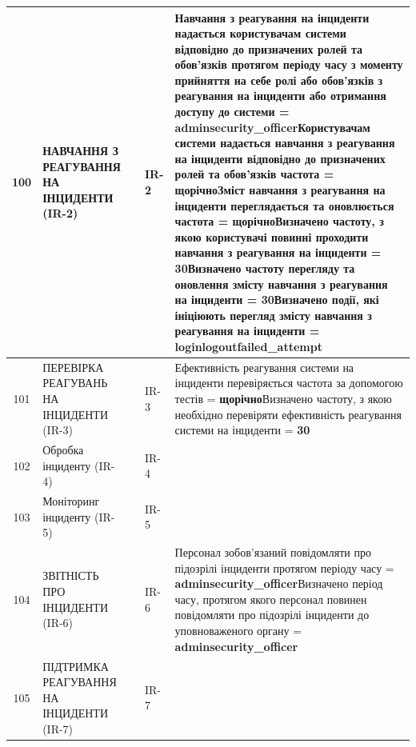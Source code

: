 \documentclass[10pt]{article}
\begin{document}
\begin{longtable}{|c|>{\raggedright\arraybackslash}p{2.5cm}|>{\raggedright\arraybackslash}p{4.5cm}|>{\raggedright\arraybackslash}p{3cm}|>{\raggedright\arraybackslash}p{4.5cm}|}
100 & НАВЧАННЯ З РЕАГУВАННЯ НА ІНЦИДЕНТИ (IR-2) &  & IR-2 & Навчання з реагування на інциденти надається користувачам системи відповідно до призначених ролей та обов'язків протягом періоду часу з моменту прийняття на себе ролі або обов'язків з реагування на інциденти або отримання доступу до системи = \textbf{adminsecurity\_\allowbreak{}officer}\newline Користувачам системи надається навчання з реагування на інциденти відповідно до призначених ролей та обов'язків частота = \textbf{щорічно}\newline Зміст навчання з реагування на інциденти переглядається та оновлюється частота = \textbf{щорічно}\newline Визначено частоту, з якою користувачі повинні проходити навчання з реагування на інциденти = \textbf{30}\newline Визначено частоту перегляду та оновлення змісту навчання з реагування на інциденти = \textbf{30}\newline Визначено події, які ініціюють перегляд змісту навчання з реагування на інциденти = \textbf{loginlogoutfailed\_\allowbreak{}attempt} \\ \hline
101 & ПЕРЕВІРКА РЕАГУВАНЬ НА ІНЦИДЕНТИ (IR-3) &  & IR-3 & Ефективність реагування системи на інциденти перевіряється частота за допомогою тестів = \textbf{щорічно}\newline Визначено частоту, з якою необхідно перевіряти ефективність реагування системи на інциденти = \textbf{30} \\ \hline
102 & Обробка інциденту (IR-4) &  & IR-4 &  \\ \hline
103 & Моніторинг інциденту (IR-5) &  & IR-5 &  \\ \hline
104 & ЗВІТНІСТЬ ПРО ІНЦИДЕНТИ (IR-6) &  & IR-6 & Персонал зобов'язаний повідомляти про підозрілі інциденти протягом періоду часу = \textbf{adminsecurity\_\allowbreak{}officer}\newline Визначено період часу, протягом якого персонал повинен повідомляти про підозрілі інциденти до уповноваженого органу = \textbf{adminsecurity\_\allowbreak{}officer} \\ \hline
105 & ПІДТРИМКА РЕАГУВАННЯ НА ІНЦИДЕНТИ (IR-7) &  & IR-7 &  \\ \hline

\end{longtable}
\end{document}
